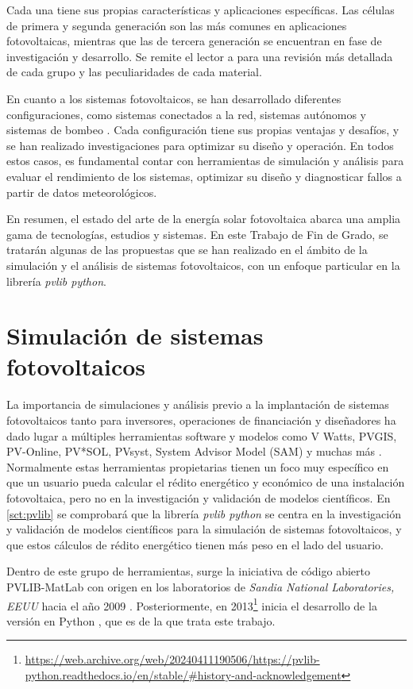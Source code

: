 Cada una tiene sus propias características y aplicaciones específicas. Las células de primera y segunda generación son las más comunes en aplicaciones fotovoltaicas, mientras que las de tercera generación se encuentran en fase de investigación y desarrollo. Se remite el lector a \cite{Shubbak_2019} para una revisión más detallada de cada grupo y las peculiaridades de cada material.

En cuanto a los sistemas fotovoltaicos, se han desarrollado diferentes configuraciones, como sistemas conectados a la red, sistemas autónomos y sistemas de bombeo \cite{Perpinan2020}. Cada configuración tiene sus propias ventajas y desafíos, y se han realizado investigaciones para optimizar su diseño y operación. En todos estos casos, es fundamental contar con herramientas de simulación y análisis para evaluar el rendimiento de los sistemas, optimizar su diseño y diagnosticar fallos a partir de datos meteorológicos.

En resumen, el estado del arte de la energía solar fotovoltaica abarca una amplia gama de tecnologías, estudios y sistemas. En este Trabajo de Fin de Grado, se tratarán algunas de las propuestas que se han realizado en el ámbito de la simulación y el análisis de sistemas fotovoltaicos, con un enfoque particular en la librería \textit{pvlib python}.

\section{Simulación de sistemas fotovoltaicos} \label{sct:simulaciones}

La importancia de simulaciones y análisis previo a la implantación de sistemas fotovoltaicos tanto para inversores, operaciones de financiación y diseñadores ha dado lugar a múltiples herramientas software y modelos como V Watts, PVGIS, PV-Online, PV*SOL, PVsyst, System Advisor Model (SAM) y muchas más \cite{stein_models_2009, Kumar_2017}. Normalmente estas herramientas propietarias tienen un foco muy específico en que un usuario pueda calcular el rédito energético y económico de una instalación fotovoltaica, pero no en la investigación y validación de modelos científicos. En \ref{sct:pvlib} se comprobará que la librería \textit{pvlib python} se centra en la investigación y validación de modelos científicos para la simulación de sistemas fotovoltaicos, y que estos cálculos de rédito energético tienen más peso en el lado del usuario.

Dentro de este grupo de herramientas, surge la iniciativa de código abierto PVLIB-MatLab con origen en los laboratorios de \textit{Sandia National Laboratories, EEUU} hacia el año 2009 \cite{Stein_Holmgren_Forbess_Hansen_2016}. Posteriormente, en 2013\footnote{\url{https://web.archive.org/web/20240411190506/https://pvlib-python.readthedocs.io/en/stable/\#history-and-acknowledgement}} inicia el desarrollo de la versión en Python \cite{Anderson_Hansen_Holmgren_Jensen_Mikofski_Driesse_2023, Stein_2012, Andrews_Stein_Hansen_Riley_2014, Holmgren_Andrews_Lorenzo_Stein_2015, Holmgren_Groenendyk_2016}, que es de la que trata este trabajo.

